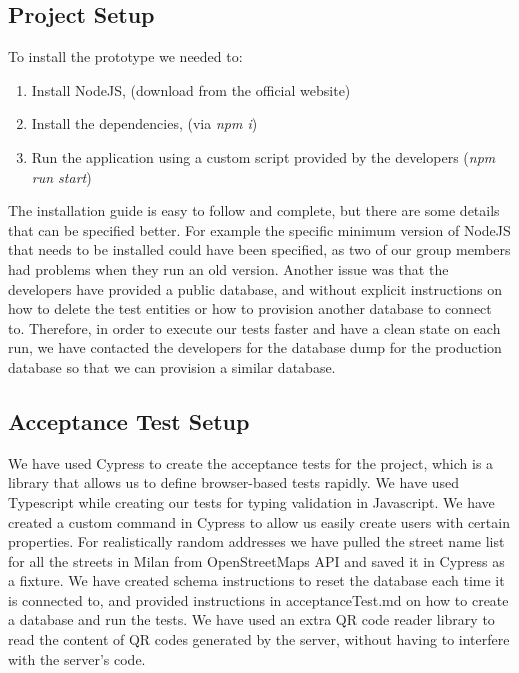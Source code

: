 \subsection{Project Setup}
To install the prototype we needed to:
\begin{enumerate}
    \item Install NodeJS, (download from the official website)
    \item Install the dependencies, (via \textit{npm i})
    \item Run the application using a custom script provided by the developers (\textit{npm run start})
\end{enumerate}
The installation guide is easy to follow and complete, but there are some details that can be specified better.
For example the specific minimum version of NodeJS that needs to be installed could have been specified, as two of our group members had problems when they run an old version.
Another issue was that the developers have provided a public database, and without explicit instructions on how to delete the test entities or how to provision another database to connect to.
Therefore, in order to execute our tests faster and have a clean state on each run, we have contacted the developers for the database dump for the production database so that we can provision a similar database.

\subsection{Acceptance Test Setup}
We have used Cypress to create the acceptance tests for the project, which is a library that allows us to define browser-based tests rapidly.
We have used Typescript while creating our tests for typing validation in Javascript.
We have created a custom command in Cypress to allow us easily create users with certain properties.
For realistically random addresses we have pulled the street name list for all the streets in Milan from OpenStreetMaps API and saved it in Cypress as a fixture.
We have created schema instructions to reset the database each time it is connected to, and provided instructions in acceptanceTest.md on how to create a database and run the tests.
We have used an extra QR code reader library to read the content of QR codes generated by the server, without having to interfere with the server's code.
